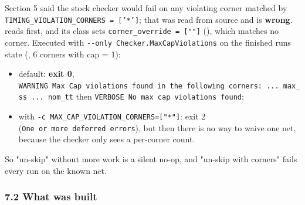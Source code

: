 \begin{record}

Section 5 said the stock checker would fail on any violating corner
matched by
\texttt{TIMING\_\allowbreak{}VIOLATION\_\allowbreak{}CORNERS\ =\allowbreak{}\ ['*']};
that was read from source and is \textbf{wrong}.
 reads 
first, and its class sets
\texttt{corner\_\allowbreak{}override\ =\allowbreak{}\ [""]}
(), which matches no corner. Executed
with
\texttt{-\allowbreak{}-\allowbreak{}only\ Checker.\allowbreak{}MaxCapViolations}
on the finished run\textquotesingle s state
(, 6 corners with cap = 1):

\begin{itemize}
\tightlist
\item
  default: \textbf{exit 0},
  \texttt{WARNING\ Max\ Cap\ violations\ found\ in\ the\ following\ corners:\allowbreak{}\ .\allowbreak{}.\allowbreak{}.\allowbreak{}\ max\_\allowbreak{}ss\ .\allowbreak{}.\allowbreak{}.\allowbreak{}\ nom\_\allowbreak{}tt}
  then \texttt{VERBOSE\ No\ max\ cap\ violations\ found};
\item
  with
  \texttt{-\allowbreak{}c\ MAX\_\allowbreak{}CAP\_\allowbreak{}VIOLATION\_\allowbreak{}CORNERS=\allowbreak{}["*"]}:
  exit 2 (\texttt{One\ or\ more\ deferred\ errors}), but then there is
  no way to waive one net, because the checker only sees a per-corner
  count.
\end{itemize}

So "un-skip" without more work is a silent no-op, and "un-skip with
corners" fails every run on the known net.

\end{record}

\subsubsection{7.2 What was built}\label{cr:defect:sky130-slew-cap-e45j:72-what-was-built}

